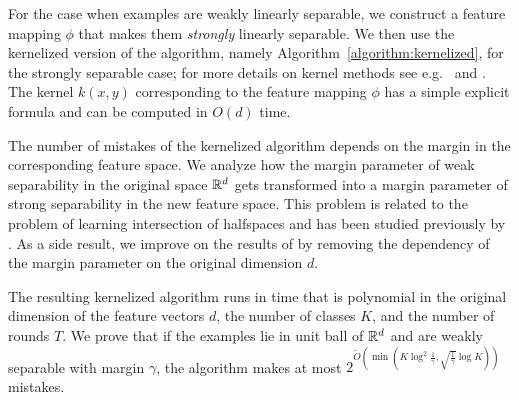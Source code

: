 For the case when examples are weakly linearly separable,
we construct a feature
mapping $\phi$ that makes them \emph{strongly} linearly separable. We then
use the kernelized version of the algorithm, namely Algorithm~\ref{algorithm:kernelized},
 for the strongly separable case; for
 more details on kernel methods see e.g.~\citet{Scholkopf-Smola-2002} and
\citet{Shawe-Taylor-Cristianini-2004}. The kernel $k(x,y)$ corresponding to the
feature mapping $\phi$ has a simple explicit formula and can be computed in
$O(d)$ time.

The number of mistakes of the kernelized algorithm depends on the margin in the
corresponding feature space. We analyze how the margin parameter of weak
separability in the original space $\mathbb{R}^d$ gets transformed into a margin
parameter of strong separability in the new feature space. This problem is
related to the problem of learning intersection of halfspaces and has been
studied previously by \citet{Klivans-Servedio-2008}.
As a side result, we improve on the results of
\citet{Klivans-Servedio-2008} by removing the dependency of the margin parameter
 on the original dimension $d$.

The resulting kernelized algorithm runs in time that is polynomial in the
original dimension of the feature vectors $d$, the number of classes $K$, and
the number of rounds $T$. We prove that if the examples lie in unit ball of
$\mathbb{R}^d$ and are weakly separable with margin $\gamma$, the algorithm makes at
most $2^{\widetilde{O}(\min(K \log^2
\frac{1}{\gamma}, \sqrt{\frac{1}{\gamma}} \log K))}$ mistakes.
